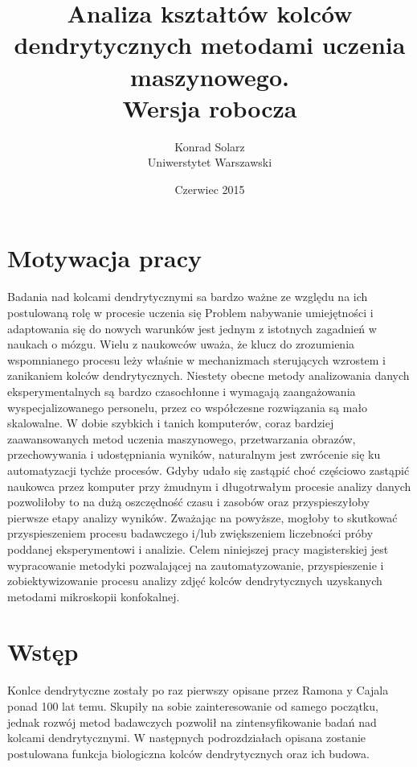 \documentclass{article}
\begin{document}
\title{Analiza kształtów kolców dendrytycznych metodami uczenia maszynowego.\\Wersja robocza}
\author{Konrad Solarz\\Uniwerstytet Warszawski}
\date{Czerwiec 2015}
\maketitle
\clearpage
\begin{abstract}


\end{abstract}
\clearpage

\tableofcontents
\clearpage

\section{Motywacja pracy}
Badania nad kolcami dendrytycznymi sa bardzo ważne ze względu na ich postulowaną rolę w procesie uczenia się %
Problem nabywanie umiejętności i adaptowania się do nowych warunków jest jednym z istotnych zagadnień w naukach o mózgu.
Wielu z naukowców uważa, że klucz do zrozumienia wspomnianego procesu leży właśnie w mechanizmach sterujących wzrostem i zanikaniem kolców dendrytycznych.
Niestety obecne metody analizowania danych eksperymentalnych są bardzo czasochłonne i wymagają zaangażowania wyspecjalizowanego personelu, przez co współczesne rozwiązania są mało skalowalne.
W dobie szybkich i tanich komputerów, coraz bardziej zaawansowanych metod uczenia maszynowego, przetwarzania obrazów, przechowywania i udostępniania wyników, naturalnym jest zwrócenie się ku automatyzacji tychże procesów.
Gdyby udało się zastąpić choć częściowo zastąpić naukowca przez komputer przy żmudnym i długotrwałym procesie analizy danych pozwoliłoby to na dużą oszczędność czasu i zasobów oraz przyspieszyłoby pierwsze etapy analizy wyników.
Zważając na powyższe, mogłoby to skutkować przyspieszeniem procesu badawczego i/lub zwiększeniem liczebności próby poddanej eksperymentowi i analizie.
Celem niniejszej pracy magisterskiej jest wypracowanie metodyki pozwalającej na zautomatyzowanie, przyspieszenie i zobiektywizowanie procesu analizy zdjęć kolców dendrytycznych uzyskanych metodami mikroskopii konfokalnej.



\section{Wstęp}
Konlce dendrytyczne zostały po raz pierwszy opisane przez Ramona y Cajala ponad 100 lat temu. %
Skupiły na sobie zainteresowanie od samego początku, jednak rozwój metod badawczych 
pozwolił na zintensyfikowanie badań nad kolcami dendrytycznymi. W następnych podrozdziałach opisana zostanie postulowana funkcja biologiczna kolców dendrytycznych oraz ich budowa.
\end{document}
